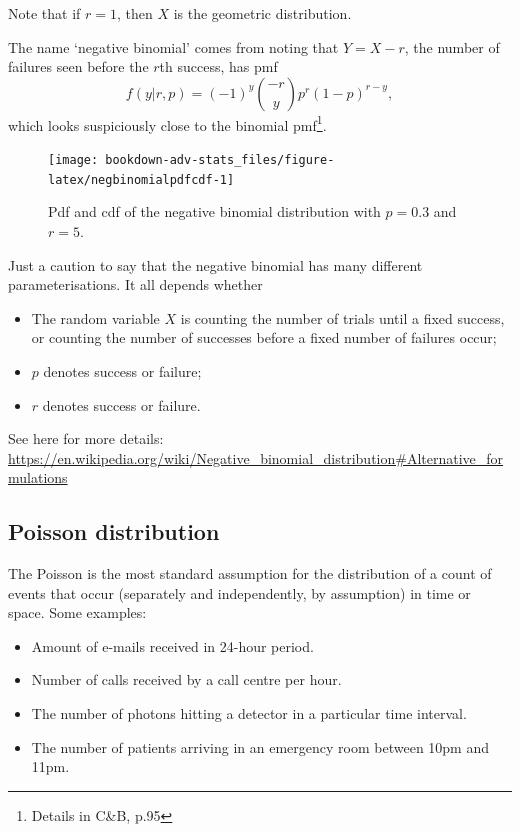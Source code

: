 \documentclass[
]{book}
\providecommand{\tightlist}{%
  \setlength{\itemsep}{0pt}\setlength{\parskip}{0pt}}
\theoremstyle{definition}
\theoremstyle{definition}
\theoremstyle{definition}
\theoremstyle{definition}
\theoremstyle{remark}
\begin{document}
Note that if \(r=1\), then \(X\) is the geometric distribution.

The name `negative binomial' comes from noting that \(Y=X-r\), the number of failures seen before the \(r\)th success, has pmf
\[
  f(y|r,p) = (-1)^y{-r \choose y} p^r(1-p)^{r-y},
\]
which looks suspiciously close to the binomial pmf\footnote{Details in C\&B, p.95}.

\begin{figure}

{\centering \texttt{[image: bookdown-adv-stats\_files/figure-latex/negbinomialpdfcdf-1]} 

}

\caption{Pdf and cdf of the negative binomial distribution with \(p=0.3\) and \(r=5\).}\label{fig:negbinomialpdfcdf}
\end{figure}

Just a caution to say that the negative binomial has many different parameterisations.
It all depends whether

\begin{itemize}
\tightlist
\item
  The random variable \(X\) is counting the number of trials until a fixed success, or counting the number of successes before a fixed number of failures occur;
\item
  \(p\) denotes success or failure;
\item
  \(r\) denotes success or failure.
\end{itemize}

See here for more details: \url{https://en.wikipedia.org/wiki/Negative_binomial_distribution\#Alternative_formulations}

\hypertarget{poisson-distribution}{%
\subsection{Poisson distribution}\label{poisson-distribution}}

The Poisson is the most standard assumption for the distribution of a count of events that occur (separately and independently, by assumption) in time or space. Some examples:

\begin{itemize}
\tightlist
\item
  Amount of e-mails received in 24-hour period.
\item
  Number of calls received by a call centre per hour.
\item
  The number of photons hitting a detector in a particular time interval.
\item
  The number of patients arriving in an emergency room between 10pm and 11pm.
\end{itemize}
\end{document}
